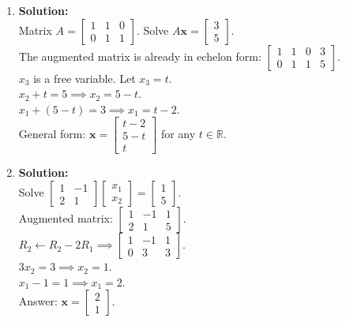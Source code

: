 \documentclass[12pt]{article}
\begin{document}
\begin{enumerate}
    \item \textbf{Solution:}\\
    Matrix $A = \begin{bmatrix} 1 & 1 & 0 \\ 0 & 1 & 1 \end{bmatrix}$. Solve $A\mathbf{x} = \begin{bmatrix} 3 \\ 5 \end{bmatrix}$. \\
    The augmented matrix is already in echelon form: $\left[\begin{array}{ccc|c} 1 & 1 & 0 & 3 \\ 0 & 1 & 1 & 5 \end{array}\right]$. \\
    $x_3$ is a free variable. Let $x_3 = t$. \\
    $x_2 + t = 5 \implies x_2 = 5 - t$. \\
    $x_1 + (5 - t) = 3 \implies x_1 = t - 2$. \\
    General form: $\mathbf{x} = \begin{bmatrix} t - 2 \\ 5 - t \\ t \end{bmatrix}$ for any $t \in \mathbb{R}$.

    \item \textbf{Solution:}\\
    Solve $\begin{bmatrix} 1 & -1 \\ 2 & 1 \end{bmatrix} \begin{bmatrix} x_1 \\ x_2 \end{bmatrix} = \begin{bmatrix} 1 \\ 5 \end{bmatrix}$. \\
    Augmented matrix: $\left[\begin{array}{cc|c} 1 & -1 & 1 \\ 2 & 1 & 5 \end{array}\right]$. \\
    $R_2 \leftarrow R_2 - 2R_1 \implies \left[\begin{array}{cc|c} 1 & -1 & 1 \\ 0 & 3 & 3 \end{array}\right]$. \\
    $3x_2 = 3 \implies x_2 = 1$. \\
    $x_1 - 1 = 1 \implies x_1 = 2$. \\
    Answer: $\mathbf{x} = \begin{bmatrix} 2 \\ 1 \end{bmatrix}$.


\end{enumerate}
\end{document}
